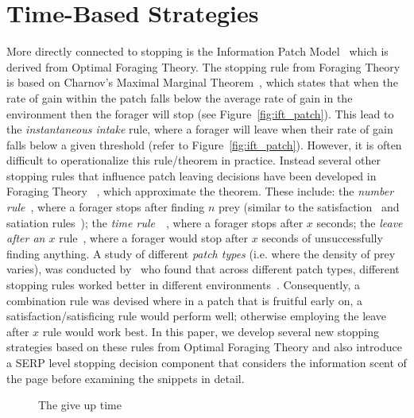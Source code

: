 \section{Time-Based Strategies}
More directly connected to stopping is the Information Patch Model~\cite{pirolli1999ift} which is derived from Optimal Foraging Theory. The stopping rule from Foraging Theory is based on Charnov's Maximal Marginal Theorem~\cite{charnov1976mvt}, which states that when the rate of gain within the patch falls below the average rate of gain in the environment then the forager will stop (see Figure~\ref{fig:ift_patch}). This lead to the \emph{instantaneous intake} rule, where a forager will leave when their rate of gain falls below a given threshold (refer to Figure~\ref{fig:ift_patch}). However, it is often difficult to operationalize this rule/theorem in practice. Instead several other stopping rules that influence patch leaving decisions have been developed in Foraging Theory ~\citet{stephens1986foraging_theory}, which approximate the theorem. These  include: the \emph{number rule}~\cite{gibbs1958number_rule}, where a forager stops after finding $n$ prey (similar to the satisfaction~\cite{cooper1973retrieval_effectiveness} and satiation rules~\cite{kraft1979stopping_rules}); the \emph{time rule}~\cite{krebs1973time_rule}~\cite{charles1972behaviour}, where a forager stops after $x$ seconds; the \emph{leave after an $x$} rule~\cite{krebs1974leave_after_rule}, where a forager would stop after $x$ seconds of unsuccessfully finding anything. A study of different \emph{patch types} (i.e. where the density of prey varies), was conducted by~\citet{mcnair1982gut_mvt} who found that across different patch types, different stopping rules worked better in different environments~\cite{mcnair1982gut_mvt, green1984oft_stopping, iwasa1981prey_distribution}. Consequently, a combination rule was devised where in a patch that is fruitful early on, a satisfaction/satisficing rule would perform well; otherwise employing the leave after $x$ rule would work best. In this paper, we develop several new stopping strategies based on these rules from Optimal Foraging Theory and also introduce a SERP level stopping decision component that considers the information scent of the page before examining the snippets in detail.

\begin{figure}[t!]
    \centering
    \caption[Give Up Time]{The give up time}
    \label{fig:gut}
\end{figure}

